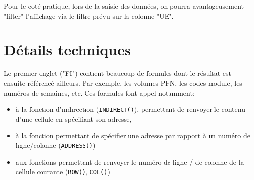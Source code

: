 \documentclass[12pt,a4paper]{article}
\begin{document}
Pour le coté pratique, lors de la saisie des données, on pourra avantageusement "filter" l'affichage via le filtre prévu sur la colonne "UE".

\section{Détails techniques}

Le premier onglet ("FI") contient beaucoup de formules dont le résultat est ensuite référencé ailleurs.
Par exemple, les volumes PPN, les codes-module, les numéros de semaines, etc.
Ces formules font appel notamment:
\begin{itemize}
\item à la fonction d'indirection ({\tt INDIRECT()}), permettant de renvoyer le contenu d'une cellule en spécifiant son adresse, 
\item à la fonction permettant de spécifier une adresse par rapport à un numéro de ligne/colonne ({\tt ADDRESS()})
\item aux fonctions permettant de renvoyer le numéro de ligne / de colonne de la cellule courante ({\tt ROW()}, {\tt COL()})

\end{itemize}
\end{document}
